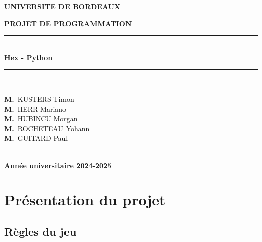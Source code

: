 \documentclass{article}
\begin{document}
\begin{titlepage}

\begin{center}
    \begin{minipage}{10cm}
        \begin{center}
        \textbf{UNIVERSITE DE BORDEAUX}\\[0.1cm]
        \end{center}
    \end{minipage}

{\huge \bfseries \uppercase{Projet De Programmation} \\[0.5cm] }

\rule{\linewidth}{0.3mm} \\[0.4cm]
{ \huge \bfseries\color{blue} Hex - Python \\[0.4cm] }
\rule{\linewidth}{0.3mm} \\[3cm]

\noindent
\begin{minipage}{.25\textwidth}
  \begin{flushleft} \large
    \textbf{M.}~\textsc{KUSTERS} Timon\\
    \textbf{M.}~\textsc{HERR} Mariano\\
    \textbf{M.}~\textsc{HUBINCU} Morgan\\
    \textbf{M.}~\textsc{ROCHETEAU} Yohann\\
    \textbf{M.}~\textsc{GUITARD} Paul\\
  \end{flushleft}
\end{minipage}%
\begin{minipage}{0.5\textwidth}
  
\end{minipage}\\[1cm]

\vfill
{\textbf{\large {Année universitaire} 2024-2025}}

\end{center}
\end{titlepage}

\newpage

\tableofcontents

\newpage
\section{Présentation du projet}

\subsection{Règles du jeu}
\end{document}
